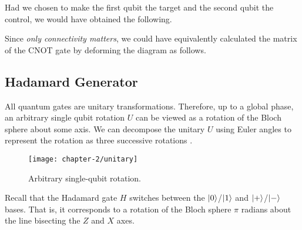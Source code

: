 Had we chosen to make the first qubit the target and the second qubit the control, we would have obtained the following.

Since \textit{only connectivity matters}, we could have equivalently calculated the matrix of the CNOT gate by deforming the diagram as follows.

\vspace{10pt}

\subsection{Hadamard Generator}

All quantum gates are unitary transformations. Therefore, up to a global phase, an arbitrary single qubit rotation $U$ can be viewed as a rotation of the Bloch sphere about some axis. We can decompose the unitary $U$ using Euler angles to represent the rotation as three successive rotations \cite{Wetering2020}.

\begin{figure}[H]
    \centering
    \texttt{[image: chapter-2/unitary]}
    \caption{Arbitrary single-qubit rotation.}
\end{figure}

Recall that the Hadamard gate $H$ switches between the $\ket 0$/$\ket 1$ and $\ket +$/$\ket -$ bases. That is, it corresponds to a rotation of the Bloch sphere $\pi$ radians about the line bisecting the $Z$ and $X$ axes.

